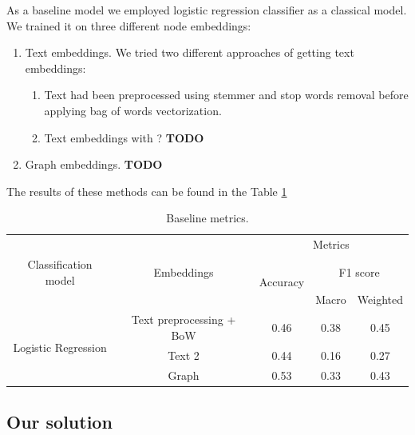 \documentclass{article}
\begin{document}
As a baseline model we employed logistic regression classifier as a classical model. We trained it on three different node embeddings:
\begin{enumerate}

\item[1.] Text embeddings. \newline
We tried two different approaches of getting text embeddings:
\begin{enumerate}
\item[a)] Text had been preprocessed using stemmer and stop words removal before applying bag of words vectorization.
\item[b)] Text embeddings with ? \textbf{TODO}
\end{enumerate}

\item[2.] Graph embeddings.\newline
\textbf{TODO}
\end{enumerate}

The results of these methods can be found in the Table \ref{table:baseline_metrics}

\begin{table}[h]
\centering
\begin{tabular}{c c  c c c}
\hline\hline
 & & \multicolumn{3}{c}{Metrics} \\
\cline{3-5}
Classification model & Embeddings & \multirow{2}{*}{Accuracy} & \multicolumn{2}{c}{F1 score} \\
 & & & Macro & Weighted \\
\hline
\multirow{3}{*}{Logistic Regression} & Text preprocessing + BoW & 0.46 & 0.38 & 0.45 \\
 & Text 2 & 0.44 & 0.16 & 0.27 \\
 & Graph & 0.53 & 0.33 & 0.43 \\
\hline
\end{tabular}
\caption{Baseline metrics.}
\label{table:baseline_metrics}
\end{table}

\subsection{Our solution}
\end{document}
